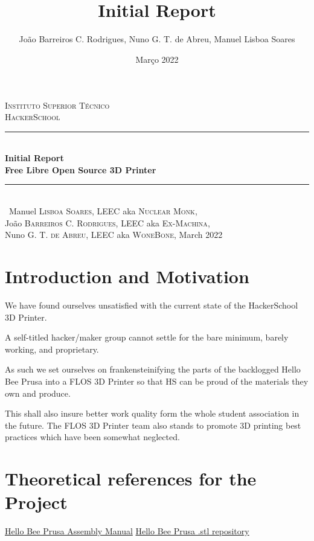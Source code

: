 \documentclass[a4paper,12pt]{article}
\date{Março 2022}
\title{ \\ \large {Initial Report}}
\author{João Barreiros C. Rodrigues, Nuno G. T. de Abreu, Manuel Lisboa Soares }
\begin{document}
	\begin{titlepage} %
        \newcommand{\HRule}{\rule{\linewidth}{0.5mm}} %
        \center %
        \textsc{\LARGE Instituto Superior Técnico}\\[1.5cm] %
	\textsc{\Large HackerSchool}\\[0.25cm]
        \HRule\\[0.4cm]
        {\LARGE\bfseries Initial Report}\\[0.4cm] %
	{\huge\bfseries Free Libre Open Source 3D Printer}\\[0.4cm] %
        \HRule\\[1.5cm]\
	Manuel \textsc{Lisboa Soares}, LEEC aka \textsc{Nuclear Monk},\\
        João \textsc{Barreiros C. Rodrigues}, LEEC aka \textsc{Ex-Machina},\\
	Nuno \textsc{G. T. de Abreu}, LEEC aka \textsc{WoneBone},
        \vfill\vfill\vfill %
        {\large March 2022} %
        \vfill %
\end{titlepage}
	\newpage
	\tableofcontents
	\clearpage
	\section{Introduction and Motivation}
	\par
	We have found ourselves unsatisfied with the current state of the HackerSchool 3D Printer. \par
	A self-titled hacker/maker group cannot settle for the bare minimum, barely  working, and proprietary. \par
	As such we set ourselves on frankensteinifying the parts of the backlogged Hello Bee Prusa into a FLOS 3D Printer so that HS can be proud of the materials they own and produce.\par
	This shall also insure better work quality form the whole student association in the future. The FLOS 3D Printer team also stands to promote 3D printing best practices which have been somewhat neglected.
	\section{Theoretical references for the Project}
	\par
	\href{https://www.manualslib.com/manual/1051705/Beeverycreative-Hello-Bee-Prusa.html?page=2#manual}{Hello Bee Prusa Assembly Manual} \newline
	\href{https://github.com/beeverycreative/helloBEEprusa-hardware/tree/master/helloBEEprusa-printed_parts}{Hello Bee Prusa .stl repository} \par	
\end{document}
